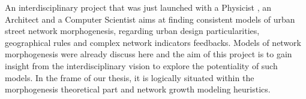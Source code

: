 
An interdisciplinary project that was just launched with a Physicist , an Architect  and a Computer Scientist  aims at finding consistent models of urban street network morphogenesis, regarding urban design particularities, geographical rules and complex network indicators feedbacks. Models of network morphogenesis were already discuss here and the aim of this project is to gain insight from the interdisciplinary vision to explore the potentiality of such models. In the frame of our thesis, it is logically situated within the morphogenesis theoretical part and network growth modeling heuristics.





